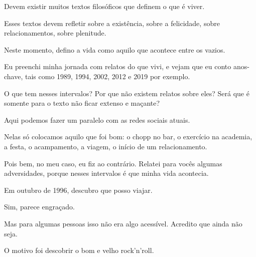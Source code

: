 \cleardoublepage




Devem existir muitos textos filosóficos que definem o que é viver. 

Esses textos devem refletir sobre a existência, sobre a felicidade, sobre relacionamentos, sobre plenitude. 

Neste momento, defino a vida como aquilo que acontece entre os vazios. 

Eu preenchi minha jornada com relatos do que vivi, e vejam que eu conto anos-chave, tais como 1989, 1994, 2002, 2012 e 2019 por exemplo. 

O que tem nesses intervalos? Por que não existem relatos sobre eles? Será que é somente para o texto não ficar extenso e maçante?

Aqui podemos fazer um paralelo com as redes sociais atuais. 

Nelas só colocamos aquilo que foi bom: o chopp no bar, o exercício na academia, a festa, o acampamento, a viagem, o início de um relacionamento. 

Pois bem, no meu caso, eu fiz ao contrário. Relatei para vocês algumas adversidades, porque nesses intervalos é que minha vida acontecia. 

Em outubro de 1996, descubro que posso viajar. 

Sim, parece engraçado. 

Mas para algumas pessoas isso não era algo acessível. Acredito que ainda não seja.

O motivo foi descobrir o bom e velho rock’n’roll. 


